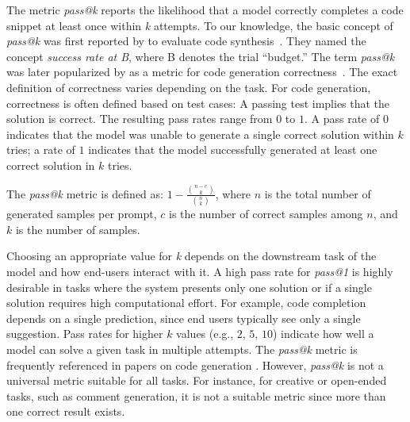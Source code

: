 The metric \emph{pass@k} reports the likelihood that a model correctly completes a code snippet at least once within \emph{k} attempts.
To our knowledge, the basic concept of \emph{pass@k} was first reported by \citeauthor{DBLP:journals/corr/abs-1906-04908} to evaluate code synthesis~\cite{DBLP:journals/corr/abs-1906-04908}.
They named the concept \emph{success rate at B}, where B denotes the trial ``budget.''
The term \emph{pass@k} was later popularized by \citeauthor{DBLP:journals/corr/abs-2107-03374} as a metric for code generation correctness~\cite{DBLP:journals/corr/abs-2107-03374}.
The exact definition of correctness varies depending on the task.
For code generation, correctness is often defined based on test cases: A passing test implies that the solution is correct.
The resulting pass rates range from $0$ to $1$.
A pass rate of $0$ indicates that the model was unable to generate a single correct solution within $k$ tries; a rate of $1$ indicates that the model successfully generated at least one correct solution in $k$ tries.

The \emph{pass@k} metric is defined as:
$1 - \frac{\binom{n-c}{k}}{\binom{n}{k}}$, where $n$ is the total number of generated samples per prompt, $c$ is the number of correct samples among  $n$, and $k$ is the number of samples.

Choosing an appropriate value for \emph{k} depends on the downstream task of the model and how end-users interact with it.
A high pass rate for \emph{pass@1} is highly desirable in tasks where the system presents only one solution or if a single solution requires high computational effort.
For example, code completion depends on a single prediction, since end users typically see only a single suggestion.
Pass rates for higher $k$ values (e.g., $2$, $5$, $10$) indicate how well a model can solve a given task in multiple attempts.
The \emph{pass@k} metric is frequently referenced in papers on code generation \cite{DBLP:journals/corr/abs-2308-12950, DBLP:journals/corr/abs-2401-14196, DBLP:journals/corr/abs-2409-12186, DBLP:journals/corr/abs-2305-06161}.
However, \emph{pass@k} is not a universal metric suitable for all tasks.
For instance, for creative or open-ended tasks, such as comment generation, it is not a suitable metric since more than one correct result exists.

